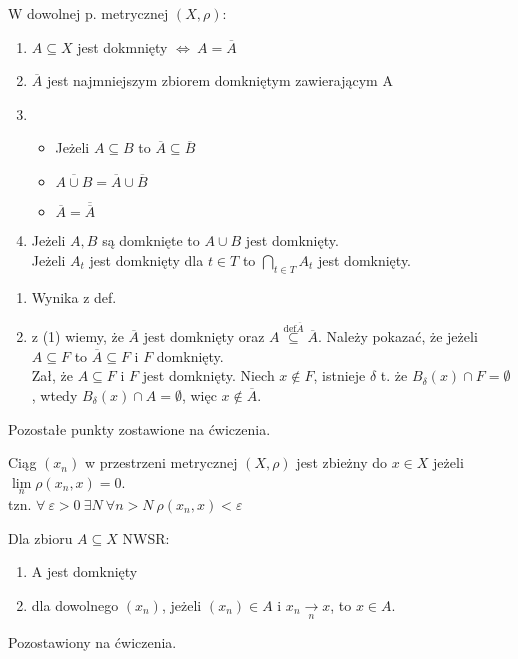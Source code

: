 \begin{tw} 
    W dowolnej p. metrycznej $(X,\rho)$: 
    \begin{enumerate}[(1)]
        \item $A \subseteq X$ jest dokmnięty $\Leftrightarrow \ A = \overline{A}$ 
        \item $\overline{A}$ jest najmniejszym zbiorem domkniętym zawierającym A
        \item \begin{itemize}
            \item Jeżeli $A \subseteq B$ to $\overline{A} \subseteq \overline{B}$ 
            \item $\overline{A \cup B} = \overline{A} \cup \overline{B}$ 
            \item $\overline{A} = \overline{\overline{A}}$
            \end{itemize}
        \item Jeżeli $A,B$ są domknięte to $A \cup B$ jest domknięty. \\ 
            Jeżeli $A_t$ jest domknięty dla $t \in T$ to $\bigcap\limits_{t \in T} A_t$ jest domknięty.
    \end{enumerate}
\end{tw} 
\begin{dd} \hfill
    \begin{enumerate}[(1)] 
        \item Wynika z def.
        \item z (1) wiemy, że $\overline{A}$ jest domknięty oraz $A \overset{\text{def} \overline{A}}{\subseteq} \overline{A}$. Należy pokazać, że jeżeli $A \subseteq F$ to $\overline{A} \subseteq F$ i $F$ domknięty. \\ 
        Zał, że $A \subseteq F$ i $F$ jest domknięty. Niech $x \notin F$, istnieje $\delta$ t. że $B_\delta (x) \cap F = \emptyset$, wtedy $B_\delta (x) \cap A = \emptyset$, więc $x \notin \overline{A}$. 
    \end{enumerate}
    Pozostałe punkty zostawione na ćwiczenia. 
\end{dd} 

\begin{df} 
    Ciąg $(x_n)$ w przestrzeni metrycznej $(X,\rho)$ jest zbieżny do $x \in X$ jeżeli $\lim\limits_n \rho(x_n,x) = 0$.\\
    tzn. $\forall \ \varepsilon > 0 \ \exists N \ \forall n > N \ \rho(x_n,x) < \varepsilon$
\end{df} 

\begin{tw} 
    Dla zbioru $A \subseteq X$ NWSR: 
    \begin{enumerate}[(1)]
        \item A jest domknięty 
        \item dla dowolnego $(x_n)$, jeżeli $(x_n) \in A$ i $x_n \underset{n}{\rightarrow} x$, to $x \in A$.
    \end{enumerate} 
\end{tw} 
\begin{dd} Pozostawiony na ćwiczenia. \end{dd}

